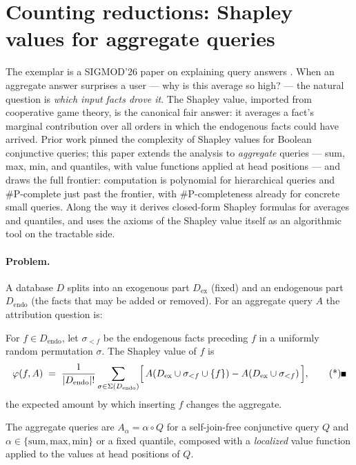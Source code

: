 \section[Counting reductions: Shapley values]{Counting reductions: Shapley values for aggregate queries}
\label{sec:red-shapley}

The exemplar is a SIGMOD'26 paper on explaining query answers \citep{sigmod26-375}.
When an aggregate answer surprises a user --- why is this average so high? --- the
natural question is \emph{which input facts drove it}. The Shapley value, imported
from cooperative game theory, is the canonical fair answer: it averages a fact's
marginal contribution over all orders in which the endogenous facts could have
arrived. Prior work pinned the complexity of Shapley values for Boolean conjunctive
queries; this paper extends the analysis to \emph{aggregate} queries --- sum, max,
min, and quantiles, with value functions applied at head positions --- and draws the
full frontier: computation is polynomial for hierarchical queries and \#P-complete
just past the frontier, with \#P-completeness already for concrete small queries.
Along the way it derives closed-form Shapley formulas for averages and quantiles, and
uses the axioms of the Shapley value itself as an algorithmic tool on the tractable
side.

\paragraph{Problem.}
A database $D$ splits into an exogenous part $D_{\mathrm{ex}}$ (fixed) and an
endogenous part $D_{\mathrm{endo}}$ (the facts that may be added or removed). For an
aggregate query $A$ the attribution question is:

\begin{definition}\label{def:red-shapley}
For $f \in D_{\mathrm{endo}}$, let $\sigma_{<f}$ be the endogenous facts preceding $f$
in a uniformly random permutation $\sigma$. The Shapley value of $f$ is
\[
\varphi(f, A) \;=\; \frac{1}{|D_{\mathrm{endo}}|!}
\sum_{\sigma \in \Sigma(D_{\mathrm{endo}})}
\Bigl[\, A(D_{\mathrm{ex}} \cup \sigma_{<f} \cup \{f\}) -
A(D_{\mathrm{ex}} \cup \sigma_{<f}) \,\Bigr], \eopm
\]
the expected amount by which inserting $f$ changes the aggregate.
\end{definition}

The aggregate queries are $A_\alpha = \alpha \circ Q$ for a self-join-free
conjunctive query $Q$ and $\alpha \in \{\mathrm{sum}, \mathrm{max}, \mathrm{min}\}$
or a fixed quantile, composed with a \emph{localized} value function applied to the
values at head positions of $Q$.

